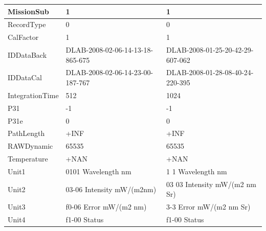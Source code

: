 \documentclass[11pt]{article}
\begin{document}
\begin{appendices}
\begin{table}[H]
\begin{tabular}{| p{3cm} | p{3cm} | p{5cm} |}
		    MissionSub & 1 & 1 \\ \hline
		    RecordType & 0 & 0 \\ \hline
		    CalFactor & 1 & 1 \\ \hline
		   IDDataBack & DLAB-2008-02-06-14-13-18-865-675 & DLAB-2008-01-25-20-42-29-607-062 \\ \hline
		   IDDataCal & DLAB-2008-02-06-14-23-00-187-767 & DLAB-2008-01-28-08-40-24-220-395 \\ \hline
		   IntegrationTime & 512 & 1024 \\ \hline
		    P31 & -1 & -1 \\ \hline
		   P31e & 0 & 0 \\ \hline
		   PathLength & +INF & +INF \\ \hline
		   RAWDynamic & 65535 & 65535 \\ \hline
		   Temperature & +NAN & +NAN \\ \hline
		   Unit1 & 0101 Wavelength nm &  1 1 Wavelength nm \\ \hline
		   Unit2 & 03-06 Intensity mW/(m2nm) & 03 03 Intensity mW/(m2 nm Sr) \\ \hline
		   Unit3 & f0-06 Error mW/(m2 nm) & 3-3 Error mW/(m2 nm Sr) \\ \hline
		  Unit4 & f1-00 Status & f1-00 Status \\ \hline
	  \end{tabular}	
\end{table}
\pagebreak


\end{appendices}
\end{document}
